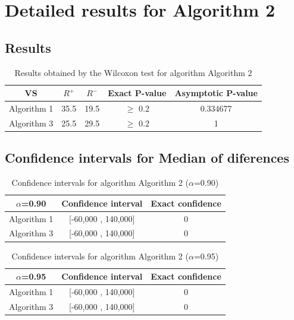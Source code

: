 \documentclass[a4paper,10pt]{article}
\begin{document}
 \clearpage 


\section{Detailed results for Algorithm 2}


\subsection{Results}

\begin{table}[!htp]
\centering\small
\begin{tabular}{
|c|c|c|c|c|}
\hline
 VS & $R^{+}$ & $R^{-}$ & Exact P-value & Asymptotic P-value \\ \hline 
Algorithm 1 & 35.5 & 19.5 & $\geq$ 0.2 & 0.334677\\ \hline 
Algorithm 3 & 25.5 & 29.5 & $\geq$ 0.2 & 1\\ \hline 

\end{tabular}
\caption{Results obtained by the Wilcoxon test for algorithm Algorithm 2}
\end{table}

\subsection{Confidence intervals for Median of diferences}

\begin{table}[!htp]
\centering\small
\begin{tabular}{
|c|c|c|}
\hline
 $\alpha$=0.90 & Confidence interval & Exact confidence \\ \hline 
Algorithm 1 & [-60,000 , 140,000] & 0\\ \hline 
Algorithm 3 & [-60,000 , 140,000] & 0\\ \hline 

\end{tabular}
\caption{Confidence intervals for algorithm Algorithm 2 ($\alpha$=0.90)}
\end{table}
\begin{table}[!htp]
\centering\small
\begin{tabular}{
|c|c|c|}
\hline
 $\alpha$=0.95 & Confidence interval & Exact confidence \\ \hline 
Algorithm 1 & [-60,000 , 140,000] & 0\\ \hline 
Algorithm 3 & [-60,000 , 140,000] & 0\\ \hline 

\end{tabular}
\caption{Confidence intervals for algorithm Algorithm 2 ($\alpha$=0.95)}
\end{table}
\end{document}
